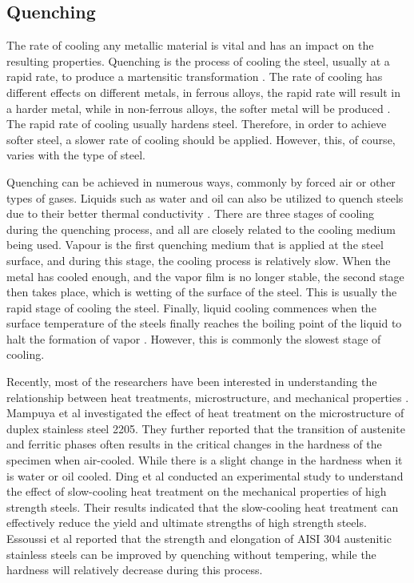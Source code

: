 \subsection{Quenching}  
The rate of cooling any metallic material is vital and has an impact on the resulting properties. Quenching is the process of cooling the steel, usually at a rapid rate, to produce a martensitic transformation \cite{singh2020applied}. The rate of cooling has different effects on different metals, in ferrous alloys, the rapid rate will result in a harder metal, while in non-ferrous alloys, the softer metal will be produced \cite{mampuya2021effect}. The rapid rate of cooling usually hardens steel. Therefore, in order to achieve softer steel, a slower rate of cooling should be applied. However, this, of course, varies with the type of steel. 

Quenching can be achieved in numerous ways, commonly by forced air or other types of gases. Liquids such as water and oil can also be utilized to quench steels due to their better thermal conductivity \cite{singh2020applied}. There are three stages of cooling during the quenching process, and all are closely related to the cooling medium being used. Vapour is the first quenching medium that is applied at the steel surface, and during this stage, the cooling process is relatively slow. When the metal has cooled enough, and the vapor film is no longer stable, the second stage then takes place, which is wetting of the surface of the steel. This is usually the rapid stage of cooling the steel. Finally, liquid cooling commences when the surface temperature of the steels finally reaches the boiling point of the liquid to halt the formation of vapor \cite{marzorati2018green, protopopoff2011surface}. However, this is commonly the slowest stage of cooling.

Recently, most of the researchers have been interested in understanding the relationship between heat treatments, microstructure, and mechanical properties \cite{marzorati2018green, whitman1924effect, cai2018influence}. Mampuya et al \cite{mampuya2021effect} investigated the effect of heat treatment on the microstructure of duplex stainless steel 2205. They further reported that the transition of austenite and ferritic phases often results in the critical changes in the hardness of the specimen when air-cooled. While there is a slight change in the hardness when it is water or oil cooled. Ding et al \cite{ding2020experimental} conducted an experimental study to understand the effect of slow-cooling heat treatment on the mechanical properties of high strength steels. Their results indicated that the slow-cooling heat treatment can effectively reduce the yield and ultimate strengths of high strength steels. Essoussi et al \cite{essoussi2019heat} reported that the strength and elongation of AISI 304 austenitic stainless steels can be improved by quenching without tempering, while the hardness will relatively decrease during this process.

